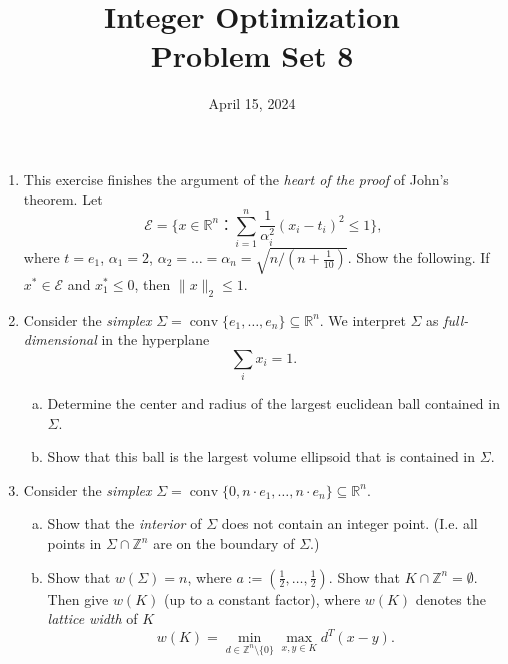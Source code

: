 \documentclass[11pt,a4paper]{article}
\title{Integer Optimization  \\ Problem Set 8 }
\date{ April 15, 2024}
\DeclareMathOperator{\conv}{conv}
\begin{document}
\maketitle 


\begin{enumerate}



\item This exercise finishes the argument of the \emph{heart of the proof} of John's theorem. Let
  \begin{displaymath}
    ℰ = \{ x ∈ ℝ^n ： ∑_{i=1}^n \frac{1}{α_i^2} (x_i - t_i)^2 ≤ 1\},  
  \end{displaymath}
  where $t = e_1$, $α_1 = 2$, $α_2=\dots=α_n  = \sqrt{n / \left(n+ \frac{1}{10}\right)}$. Show the following. If $x^* ∈ ℰ$ and $x^*_1 ≤0$, then $\|x\|_2 ≤ 1$.  
  

 
\item Consider the \emph{simplex} $Σ = \conv \{e_1,\dots,e_n\} ⊆ ℝ^n$. We interpret $Σ$ as \emph{full-dimensional} in the hyperplane
  \begin{displaymath}
    ∑_i x_i = 1. 
  \end{displaymath}
  
  \begin{enumerate}[a)]
   
  \item Determine the center and radius of the largest euclidean ball contained in $Σ$.
  \item Show that this ball is the largest volume ellipsoid that is contained in $Σ$.
  \end{enumerate}
  
  

\item Consider  the \emph{simplex} $Σ = \conv \{0, n⋅e_1,\dots,n⋅e_n\} ⊆ ℝ^n$.
  \begin{enumerate}[a)]
  \item Show that the \emph{interior} of $Σ$ does not contain an integer point. (I.e. all points in $Σ ∩ℤ^n$ are on the boundary of $Σ$.)
  \item Show that $w(Σ) = n$,
    where $a:=\left(\frac{1}{2},\hdots,\frac{1}{2}\right)$. Show that $K∩\mathbb{Z}^n =\emptyset$. Then give $w(K)$ (up to a constant factor), where $w(K)$ denotes the \emph{lattice width} of $K$
  \begin{displaymath}
    w(K) = \min_{d ∈ ℤ^n \setminus \{0\}} \max_{x,y ∈K} d^T(x - y).
  \end{displaymath}
  

\end{enumerate}
\end{enumerate}
\end{document}
